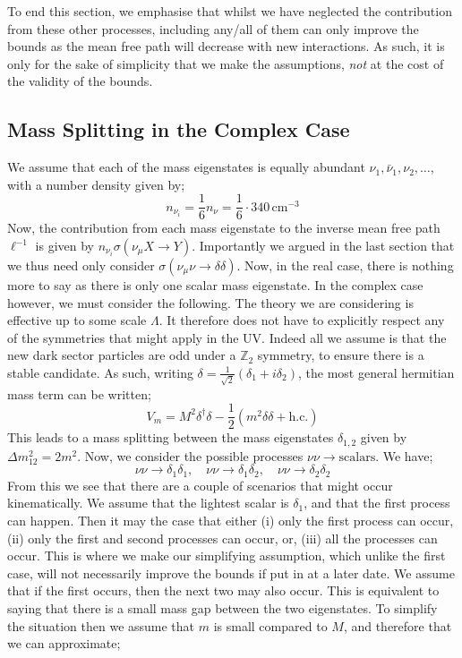 \documentclass[11pt]{article}
\numberwithin{equation}{section}
\numberwithin{figure}{section}
\numberwithin{table}{section}
\newcommand{\dagg}{^{\dagger}}
\begin{document}
To end this section, we emphasise that whilst we have neglected the contribution from these other processes, including any/all of them can only improve the bounds as the mean free path will decrease with new interactions. As such, it is only for the sake of simplicity that we make the assumptions, \textit{not} at the cost of the validity of the bounds.



\subsection{Mass Splitting in the Complex Case}\label{sec:complexsplit}



We assume that each of the mass eigenstates is equally abundant $\nu_1, \bar{\nu}_1, \nu_2, \ldots$, with a number density given by;
\begin{equation}
  n_{\nu_i} = \frac{1}{6} n_\nu = \frac{1}{6} \cdot 340 \, \textrm{cm}^{-3}
\end{equation}
Now, the contribution from each mass eigenstate to the inverse mean free path $\ell^{-1}$ is given by $n_{\nu_i} \sigma(\nu_\mu X \rightarrow Y )$. Importantly we argued in the last section that we thus need only consider $\sigma(\nu_\mu \nu \rightarrow \delta \delta)$. Now, in the real case, there is nothing more to say as there is only one scalar mass eigenstate. In the complex case however, we must consider the following. The theory we are considering is effective up to some scale $\Lambda$. It therefore does not have to explicitly respect any of the symmetries that might apply in the UV. Indeed all we assume is that the new dark sector particles are odd under a $\mathbb{Z}_2$ symmetry, to ensure there is a stable candidate. As such, writing $\delta = \tfrac{1}{\sqrt{2}}(\delta_1 + i \delta_2)$, the most general hermitian mass term can be written;
\begin{equation}
  V_m = M^2 \delta\dagg \delta - \frac{1}{2}(m^2 \delta \delta + \textrm{h.c.})
\end{equation}
This leads to a mass splitting between the mass eigenstates $\delta_{1,2}$ given by $\Delta m_{12}^2 = 2m^2$. Now, we consider the possible processes $\nu\nu \rightarrow \textrm{scalars}$. We have;
\begin{equation*}
\nu\nu \rightarrow \delta_1 \delta_1, \quad \nu\nu \rightarrow \delta_1 \delta_2, \quad \nu\nu \rightarrow \delta_2 \delta_2
\end{equation*}
From this we see that there are a couple of scenarios that might occur kinematically. We assume that the lightest scalar is $\delta_1$, and that the first process can happen. Then it may the case that either (i) only the first process can occur, (ii) only the first and second processes can occur, or, (iii) all the processes can occur. This is where we make our simplifying assumption, which unlike the first case, will not necessarily improve the bounds if put in at a later date. We assume that if the first occurs, then the next two may also occur. This is equivalent to saying that there is a small mass gap between the two eigenstates. To simplify the situation then we assume that $m$ is small compared to $M$, and therefore that we can approximate;
\end{document}
